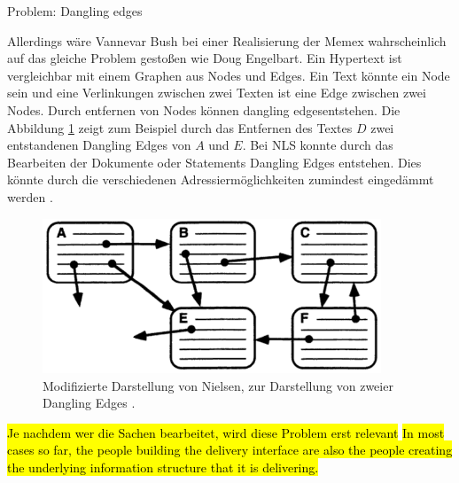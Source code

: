 \begin{section}{Problem: Dangling edges}
\label{sec:dangling}

Allerdings wäre Vannevar Bush bei einer Realisierung der Memex wahrscheinlich auf das gleiche Problem gestoßen wie Doug Engelbart. Ein Hypertext ist vergleichbar mit einem Graphen aus Nodes und Edges. Ein Text könnte ein Node sein und eine Verlinkungen zwischen zwei Texten ist eine Edge zwischen zwei Nodes. Durch entfernen von Nodes können \glqq dangling edges\grqq{ }entstehen. Die Abbildung \ref{fig:dangle} zeigt zum Beispiel durch das Entfernen des Textes $D$ zwei entstandenen Dangling Edges von $A$ und $E$. Bei NLS konnte durch das Bearbeiten der Dokumente oder Statements Dangling Edges entstehen. Dies könnte durch die verschiedenen Adressiermöglichkeiten zumindest eingedämmt werden \cite{Engelbart1984}.

\begin{figure}[H]
	\centering
	\includegraphics[width=0.9\textwidth]{image/dangle}
	\caption{Modifizierte Darstellung von Nielsen, zur Darstellung von zweier Dangling Edges \cite[S.1]{Nielsen1995}.}
	\label{fig:dangle}
\end{figure}

\end{section}

\hl{Je nachdem wer die Sachen bearbeitet, wird diese Problem erst relevant}
\hl{In most cases so far, the people building the delivery interface are also the people creating the underlying information structure that it is delivering.}

